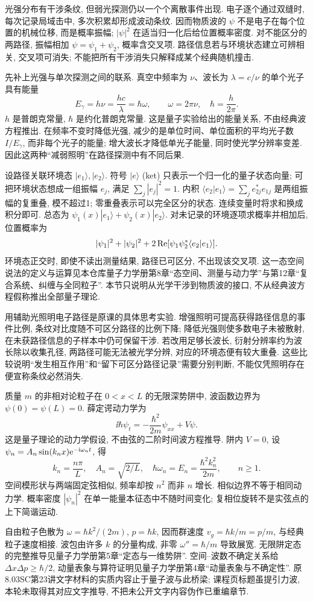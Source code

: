 \label{ch:quantum}
光强分布有干涉条纹, 但弱光探测仍以一个个离散事件出现. 电子逐个通过双缝时, 每次记录局域击中, 多次积累却形成波动条纹. 因而物质波的 $\psi$ 不是电子在每个位置的机械位移, 而是概率振幅; $|\psi|^2$ 在适当归一化后给位置概率密度. 对不能区分的两路径, 振幅相加 $\psi=\psi_1+\psi_2$, 概率含交叉项. 路径信息若与环境状态建立可辨相关, 交叉项可消失; 不能把所有干涉消失只解释成某个经典随机撞击.

先补上光强与单次探测之间的联系. 真空中频率为 $\nu$、波长为 $\lambda=c/\nu$ 的单个光子具有能量
\[
E_\gamma=h\nu=\frac{hc}{\lambda}=\hbar\omega,\qquad
\omega=2\pi\nu,\quad \hbar=\frac{h}{2\pi}.
\]
$h$ 是普朗克常量, $\hbar$ 是约化普朗克常量. 这是量子实验给出的能量关系, 不由经典波方程推出. 在频率不变时降低光强, 减少的是单位时间、单位面积的平均光子数 $I/E_\gamma$, 而非每个光子的能量; 增大波长才降低单光子能量, 同时使光学分辨率变差. 因此这两种“减弱照明”在路径探测中有不同后果.

设路径关联环境态 $|e_1\rangle,|e_2\rangle$. 符号 $|e\rangle$ (ket) 只表示一个归一化的量子状态向量; 可把环境状态想成一组振幅 $e_j$, 满足 $\sum_j|e_j|^2=1$. 内积 $\langle e_2|e_1\rangle=\sum_j e_{2j}^*e_{1j}$ 是两组振幅的复重叠, 模不超过1; 零重叠表示可以完全区分的状态. 连续变量时将求和换成积分即可. 总态为 $\psi_1(x)|e_1\rangle+\psi_2(x)|e_2\rangle$. 对未记录的环境逐项求概率并相加后, 位置概率为
\[|\psi_1|^2+|\psi_2|^2+2\operatorname{Re}[\psi_1\psi_2^*\langle e_2|e_1\rangle].\] 环境态正交时, 即使不读出测量结果, 路径已可区分, 不出现该交叉项. 这一态空间说法的定义与运算见本仓库量子力学册第8章“态空间、测量与动力学”与第12章“复合系统、纠缠与全同粒子”. 本节只说明从光学干涉到物质波的接口, 不从经典波方程假称推出全部量子理论.

用辅助光照明电子路径是原课的具体思考实验. 增强照明可提高获得路径信息的事件比例, 条纹对比度随不可区分路径的比例下降; 降低光强则使多数电子未被散射, 在未获路径信息的子样本中仍可保留干涉. 若改用足够长波长, 衍射分辨率约为波长除以收集孔径, 两路径可能无法被光学分辨, 对应的环境态便有较大重叠. 这些比较说明“发生相互作用”和“留下可区分路径记录”需要分别判断, 不能仅凭照明存在便宣称条纹必然消失.

质量 $m$ 的非相对论粒子在 $0<x<L$ 的无限深势阱中, 波函数边界为 $\psi(0)=\psi(L)=0$. 薛定谔动力学为
\[
\ii\hbar\psi_t=-\frac{\hbar^2}{2m}\psi_{xx}+V\psi.
\]
这是量子理论的动力学假设, 不由弦的二阶时间波方程推导. 阱内 $V=0$, 设 $\psi_n=A_n\sin(k_nx)\mathrm e^{-\mathrm i\omega_nt}$, 得
\[
k_n=\frac{n\pi}{L},\quad A_n=\sqrt{2/L},\quad
\hbar\omega_n=E_n=\frac{\hbar^2k_n^2}{2m},\qquad n\ge1.
\]
空间模形状与两端固定弦相似, 频率却按 $n^2$ 而非 $n$ 增长. 相似边界不等于相同动力学. 概率密度 $|\psi_n|^2$ 在单一能量本征态中不随时间变化; 复相位旋转不是实弦点的上下简谐运动.

自由粒子色散为 $\omega=\hbar k^2/(2m)$, $p=\hbar k$, 因而群速度 $v_g=\hbar k/m=p/m$, 与经典粒子速度相接. 波包由许多 $k$ 的分量构成, 非零 $\omega''=\hbar/m$ 导致展宽. 无限阱定态的完整推导见量子力学册第5章“定态与一维势阱”. 空间--波数不确定关系给 $\Delta x\Delta p\ge\hbar/2$, 动量表象与算符证明见量子力学册第4章“动量表象与不确定性”. 原8.03SC第23讲文字材料的实质内容止于量子波与此桥梁; 课程页标题虽提引力波, 本轮未取得其对应文字推导, 不把未公开文字内容伪作已重编章节.
